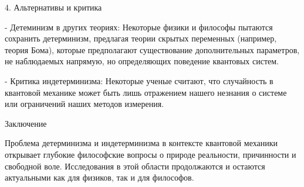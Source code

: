 \documentclass[exam_answers.tex]{subfiles}
\begin{document}
4. Альтернативы и критика

- Детеминизм в других теориях: Некоторые физики и философы пытаются сохранить детерминизм, предлагая теории скрытых переменных (например, теория Бома), которые предполагают существование дополнительных параметров, не наблюдаемых напрямую, но определяющих поведение квантовых систем.

- Критика индетерминизма: Некоторые ученые считают, что случайность в квантовой механике может быть лишь отражением нашего незнания о системе или ограничений наших методов измерения.

Заключение

Проблема детерминизма и индетерминизма в контексте квантовой механики открывает глубокие философские вопросы о природе реальности, причинности и свободной воле. Исследования в этой области продолжаются и остаются актуальными как для физиков, так и для философов.
\end{document}

